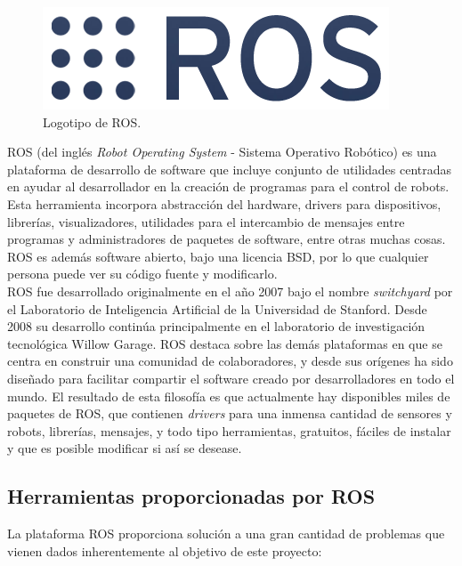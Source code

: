 \documentclass[12pt, a4paper]{report}
\begin{document}
\begin{figure}
  \begin{center}
    \includegraphics[scale=1.2]{../img/Logo-ROS.png} 
  \end{center}
  \caption[Logotipo de ROS]{Logotipo de ROS.}
  \label{fig: ros_logo}
\end{figure}

ROS (del inglés \textit{Robot Operating System} - Sistema Operativo Robótico) es una plataforma de desarrollo de software que incluye conjunto de utilidades centradas en ayudar al desarrollador en la creación de programas para el control de robots. Esta herramienta incorpora abstracción del hardware, drivers para dispositivos, librerías, visualizadores, utilidades para el intercambio de mensajes entre programas y administradores de paquetes de software, entre otras muchas cosas. ROS es además software abierto, bajo una licencia BSD, por lo que cualquier persona puede ver su código fuente y modificarlo.\\

ROS fue desarrollado originalmente en el año 2007 bajo el nombre \textit{switchyard} por el Laboratorio de Inteligencia Artificial de la Universidad de Stanford. Desde 2008 su desarrollo continúa principalmente en el laboratorio de investigación tecnológica Willow Garage. ROS destaca sobre las demás plataformas en que se centra en construir una comunidad de colaboradores, y desde sus orígenes ha sido diseñado para facilitar compartir el software creado por desarrolladores en todo el mundo. El resultado de esta filosofía es que actualmente hay disponibles miles de paquetes de ROS, que contienen \textit{drivers} para una inmensa cantidad de sensores y robots, librerías, mensajes, y todo tipo herramientas, gratuitos, fáciles de instalar y que es posible modificar si así se desease.\\

\subsection{Herramientas proporcionadas por ROS}

La plataforma ROS proporciona solución a una gran cantidad de problemas que vienen dados inherentemente al objetivo de este proyecto:
\end{document}
